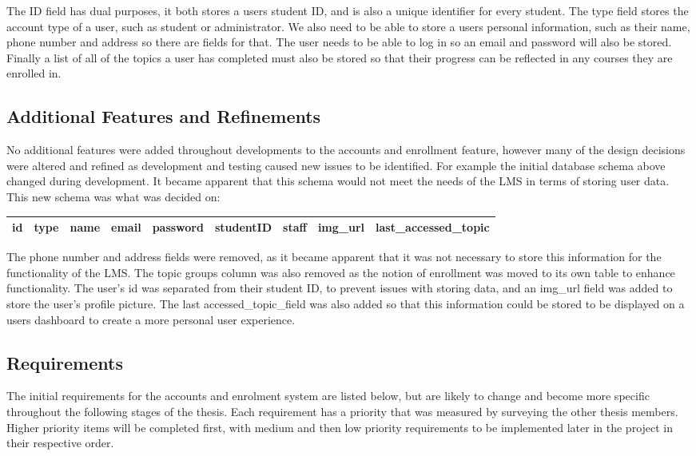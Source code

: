 The ID field has dual purposes, it both stores a users student ID, and is also a unique identifier for every student. The type field stores the account type of a user, such as student or administrator. We also need to be able to store a users personal information, such as their name, phone number and address so there are fields for that. The user needs to be able to log in so an email and password will also be stored. Finally a list of all of the topics a user has completed must also be stored so that their progress can be reflected in any courses they are enrolled in.\\


\subsection{Additional Features and Refinements}

No additional features were added throughout developments to the accounts and enrollment feature, however many of the design decisions were altered and refined as development and testing caused new issues to be identified. For example the initial database schema above changed during development. It became apparent that this schema would not meet the needs of the LMS in terms of storing user data. This new schema was what was decided on:
\begin{center}
    \begin{tabular}{|c|c|c|c|c|c|c|c|c|} 
        \hline
        id & type & name & email & password & studentID & staff & img\_url & last\_accessed\_topic \\ [0.5ex] 
        \hline
    \end{tabular}
\end{center}
The phone number and address fields were removed, as it became apparent that it was not necessary to store this information for the functionality of the LMS. The topic groups column was also removed as the notion of enrollment was moved to its own table to enhance functionality. The user's id was separated from their student ID, to prevent issues with storing data, and an img\_url field was added to store the user's profile picture. The last accessed\_topic\_field was also added so that this information could be stored to be displayed on a users dashboard to create a more personal user experience. 

\subsection{Requirements}
The initial requirements for the accounts and enrolment system are listed below, but are likely to change and become more specific throughout the following stages of the thesis. Each requirement has a priority that was measured by surveying the other thesis members. Higher priority items will be completed first, with medium and then low priority requirements to be implemented later in the project in their respective order.

